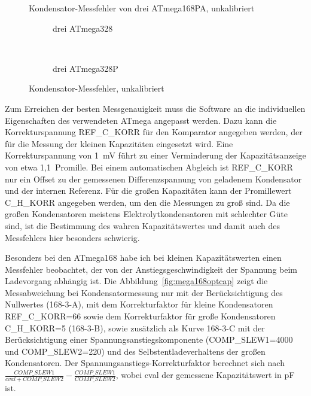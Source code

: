 \begin{figure}[H]
\centering

\caption{Kondensator-Messfehler von drei ATmega168PA, unkalibriert}
\label{fig:mega168PAall}
\end{figure}

\begin{figure}[H]
  \begin{subfigure}[b]{9cm}
    \centering
    \resizebox{9cm}{!}{}
    \caption{drei ATmega328}
    \label{fig:mega328all}
  \end{subfigure}
  ~
  \begin{subfigure}[b]{9cm}
    \centering
    \resizebox{9cm}{!}{}
    \caption{drei ATmega328P}
    \label{fig:mega328Pall}
  \end{subfigure}
  \caption{Kondensator-Messfehler, unkalibriert}
\end{figure}

Zum Erreichen der besten Messgenauigkeit muss die Software an die individuellen Eigenschaften des verwendeten ATmega
angepasst werden. Dazu kann die Korrekturspannung REF\_C\_KORR für den Komparator angegeben werden, der für die Messung der kleinen 
Kapazitäten eingesetzt wird. Eine Korrekturspannung von 1~mV führt zu einer Verminderung der Kapazitätsanzeige von etwa 1,1~Promille.
Bei einem automatischen Abgleich ist REF\_C\_KORR  nur ein Offset zu der gemessenen Differenzspannung von geladenem Kondensator
und der internen Referenz.
Für die großen Kapazitäten kann der Promillewert C\_H\_KORR angegeben werden, um den die Messungen
zu groß sind.
Da die großen Kondensatoren meistens Elektrolytkondensatoren mit schlechter Güte sind, ist die Bestimmung
des wahren Kapazitätswertes und damit auch des Messfehlers hier besonders schwierig.

Besonders bei den ATmega168 habe ich bei kleinen Kapazitätswerten einen Messfehler beobachtet, 
der von der Anstiegsgeschwindigkeit der Spannung beim Ladevorgang abhängig ist.
Die Abbildung~\ref{fig:mega168optcap} zeigt die Messabweichung bei Kondensatormessung nur mit der Berücksichtigung des
Nullwertes (168-3-A), mit dem Korrekturfaktor für kleine Kondensatoren REF\_C\_KORR=66 sowie dem Korrekturfaktor für große
Kondensatoren C\_H\_KORR=5 (168-3-B), sowie zusätzlich als Kurve 168-3-C  mit der Berücksichtigung einer Span\-nungs\-an\-stiegs\-kom\-po\-nen\-te 
(COMP\_SLEW1=4000 und COMP\_SLEW2=220) und des Selbst\-ent\-lade\-ver\-hal\-tens der großen Kon\-den\-sa\-toren.
Der Span\-nungs\-an\-stiegs-Kor\-rek\-tur\-faktor berechnet sich nach \(\frac{COMP\_SLEW1}{cval+COMP\_SLEW2} - \frac{COMP\_SLEW1}{COMP\_SLEW2}\),
wobei cval der gemessene Kapazitätswert in pF ist.

